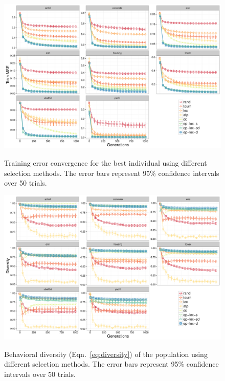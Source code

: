 \documentclass[twoside]{article}
\begin{document}
\begin{figure}
\centering
  \includegraphics[width=\textwidth]{figs/regression_training_error.pdf}\\
 \caption{Training error convergence for the best individual using different selection methods. The error bars represent 95\% confidence intervals over 50 trials.}
\label{fig:train}
\end{figure}

\begin{figure}
\centering
  \includegraphics[width=\textwidth]{figs/regression_novelty.pdf}\\
 \caption{Behavioral diversity (Eqn.~\ref{eq:diversity}) of the population using different selection methods. The error bars represent 95\% confidence intervals over 50 trials.}
\label{fig:diversity}
\end{figure}
\end{document}
